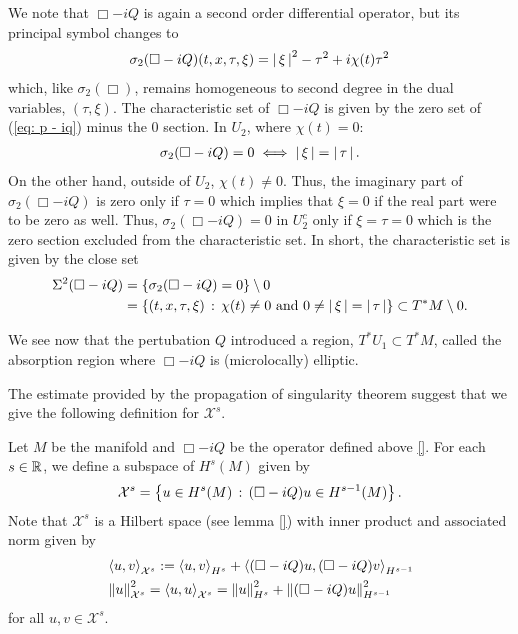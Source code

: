 \documentclass[12pt]{article}
\begin{document}
We note that $\Box - iQ$ is again a second order differential operator, but its principal symbol changes to 
\begin{align}
\sigma_2(\Box - iQ)(t, x, \tau, \xi) = \abs{\xi}^2 - \tau^2 + i \chi(t) \tau^2 \label{eq: p - iq} 
\end{align}
which, like $\sigma_2(\Box)$, remains homogeneous to second degree in the dual variables, $(\tau, \xi)$. The characteristic set of $\Box - iQ$ is given by the zero set of (\ref{eq: p - iq}) minus the 0 section. In $U_2$, where $\chi(t) = 0$: 
\begin{align*}
\sigma_2(\Box - iQ) = 0 \iff \abs{\xi} = \abs{\tau}. 
\end{align*} 
On the other hand, outside of $U_2$, $\chi(t) \neq 0 $. Thus, the imaginary part of $\sigma_2(\Box - iQ)$ is zero only if $\tau = 0$ which implies that $\xi = 0$ if the real part were to be zero as well. Thus, $\sigma_2(\Box - iQ) = 0$ in $U_2^c$ only if $\xi = \tau = 0$ which is the zero section excluded from the characteristic set. In short, the characteristic set is given by the close set 
\begin{align*}
\Char^2(\Box - iQ) 
& = \set{\sigma_2(\Box - iQ) = 0} \setminus 0 \\
& = \set{(t, x, \tau, \xi) \wh \chi(t) \neq 0 \text{ and }  0 \neq \abs{\xi} = \abs{\tau}} \subset T^* M \setminus 0. 
\end{align*}

We see now that the pertubation $Q$ introduced a region, $T^*U_1 \subset T^*M$, called the absorption region where $\Box - iQ$ is (microlocally) elliptic. 


The estimate provided by the propagation of singularity theorem suggest that we give the following definition for $\mathcal{X}^s$. 

\begin{fdefinition}
    Let $M$ be the manifold and $\Box -i Q$ be the operator defined above \ref{}. For each $s \in \R$, we define a subspace of $H^{s}(M)$ given by
    \begin{align*}
    \mathcal{X}^s = \set{u \in H^s(M) \wh (\Box - i Q)u \in H^{s - 1}(M)}. 
    \end{align*}
    Note that $\mathcal{X}^s$ is a Hilbert space (see lemma \ref{}) with inner product and associated norm given by 
    \begin{align*}
    &\inprod[u, v]_{\mathcal{X}^s} := \inprod[u, v]_{H^{s}} + \inprod[(\Box - iQ)u, (\Box - iQ)v]_{H^{s -1}} \\
    & \norm[u]_{\mathcal{X}^s}^2 = \inprod[u, u]_{\mathcal{X}^s} = \norm[u]_{H^s}^2 + \norm[(\Box - iQ)u]_{H^{s - 1}}^2
    \end{align*}
    for all $u, v \in \mathcal{X}^s$. 
\end{fdefinition}
\end{document}
